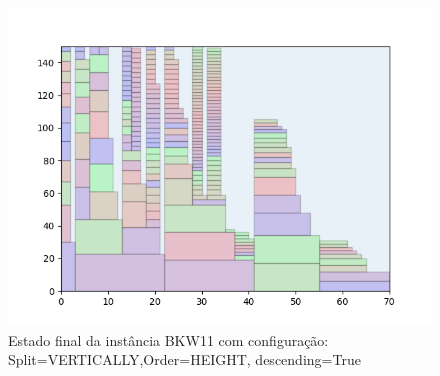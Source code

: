 \begin{figure}[H]
    \centering
    \caption[]{Estado final da instância BKW11 com configuração: Split=VERTICALLY,Order=HEIGHT, descending=True}
    \label{fig:bkw11-vertically-height-true}
    \includegraphics[scale=0.5]{output/figures/bkw/bkw11/vertically/height/true/000}
\end{figure}
